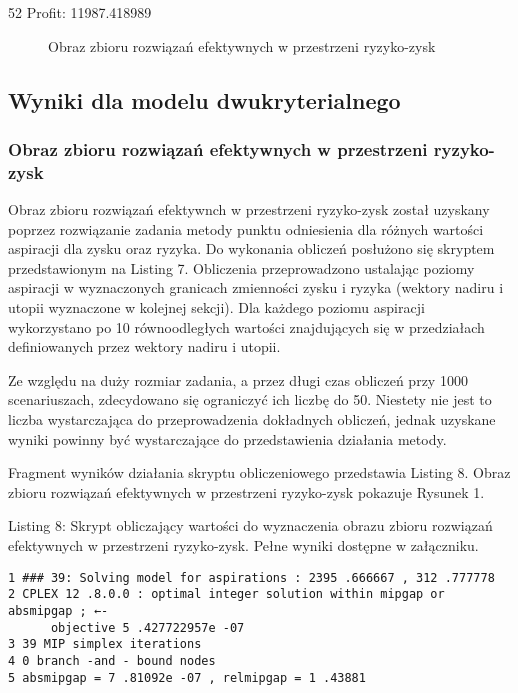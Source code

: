 \documentclass[12pt]{article}
\begin{document}
52 Profit: 11987.418989

\begin{figure}[h!]
\centering
\caption{Obraz zbioru rozwiązań efektywnych w przestrzeni ryzyko-zysk}
\label{fig:solutions}
\end{figure}

\subsection{Wyniki dla modelu dwukryterialnego}

\subsubsection{Obraz zbioru rozwiązań efektywnych w przestrzeni ryzyko-zysk}

Obraz zbioru rozwiązań efektywnch w przestrzeni ryzyko-zysk został uzyskany poprzez rozwiązanie zadania metody punktu odniesienia dla różnych wartości aspiracji dla zysku oraz ryzyka. Do wykonania obliczeń posłużono się skryptem przedstawionym na Listing 7. Obliczenia przeprowadzono ustalając poziomy aspiracji w wyznaczonych granicach zmienności zysku i ryzyka (wektory nadiru i utopii wyznaczone w kolejnej sekcji). Dla każdego poziomu aspiracji wykorzystano po 10 równoodległych wartości znajdujących się w przedziałach definiowanych przez wektory nadiru i utopii.

Ze względu na duży rozmiar zadania, a przez długi czas obliczeń przy 1000 scenariuszach, zdecydowano się ograniczyć ich liczbę do 50. Niestety nie jest to liczba wystarczająca do przeprowadzenia dokładnych obliczeń, jednak uzyskane wyniki powinny być wystarczające do przedstawienia działania metody.

Fragment wyników działania skryptu obliczeniowego przedstawia Listing 8. Obraz zbioru rozwiązań efektywnych w przestrzeni ryzyko-zysk pokazuje Rysunek 1.

Listing 8: Skrypt obliczający wartości do wyznaczenia obrazu zbioru rozwiązań efektywnych w przestrzeni ryzyko-zysk. Pełne wyniki dostępne w załączniku.

\begin{verbatim}
1 ### 39: Solving model for aspirations : 2395 .666667 , 312 .777778
2 CPLEX 12 .8.0.0 : optimal integer solution within mipgap or absmipgap ; ←-
      objective 5 .427722957e -07
3 39 MIP simplex iterations
4 0 branch -and - bound nodes
5 absmipgap = 7 .81092e -07 , relmipgap = 1 .43881
\end{verbatim}
\end{document}
